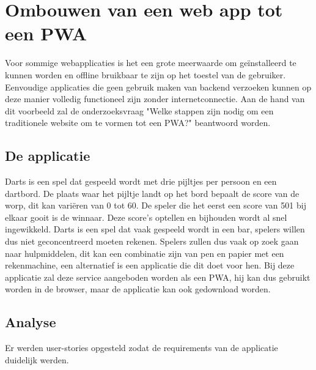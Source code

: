 \chapter{Ombouwen van een web app tot een PWA}
\label{ch:TransformerenNaarEenPWA}



Voor sommige webapplicaties is het een grote meerwaarde om geïnstalleerd te kunnen worden  en offline bruikbaar te zijn op het toestel van de gebruiker.\autocite{Mozilla2020c} Eenvoudige applicaties die geen gebruik maken van backend verzoeken kunnen op deze manier volledig functioneel zijn zonder internetconnectie. 
Aan de hand van dit voorbeeld zal de onderzoeksvraag "Welke stappen zijn nodig om een traditionele website om te vormen tot een PWA?" beantwoord worden.

\section{De applicatie}

	Darts is een spel dat gespeeld wordt met drie pijltjes per persoon en een dartbord. De plaats waar het pijltje landt op het bord bepaalt de score van de worp, dit kan variëren van 0 tot 60. De speler die het eerst een score van 501 bij elkaar gooit is de winnaar. Deze score’s optellen en bijhouden wordt al snel ingewikkeld. Darts is een spel dat vaak gespeeld wordt in een bar, spelers willen dus niet geconcentreerd moeten rekenen. Spelers zullen dus vaak op zoek gaan naar hulpmiddelen, dit kan een combinatie zijn van pen en papier met een rekenmachine, een alternatief is een applicatie die dit doet voor hen. Bij deze applicatie zal deze service aangeboden worden als een PWA, hij kan dus gebruikt worden in de browser, maar de applicatie kan ook gedownload worden.

\section{Analyse}

	Er werden user-stories opgesteld zodat de requirements van de applicatie duidelijk werden.  
	
